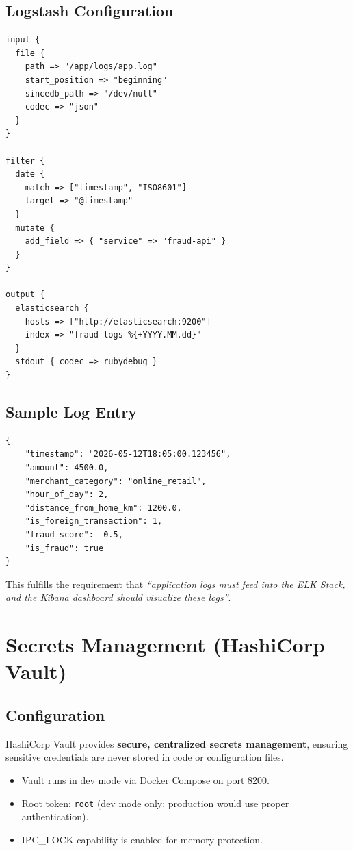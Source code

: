 \documentclass[12pt,a4paper]{article}
\begin{document}
\subsection{Logstash Configuration}

\begin{lstlisting}[language={},caption={logstash.conf}]
input {
  file {
    path => "/app/logs/app.log"
    start_position => "beginning"
    sincedb_path => "/dev/null"
    codec => "json"
  }
}

filter {
  date {
    match => ["timestamp", "ISO8601"]
    target => "@timestamp"
  }
  mutate {
    add_field => { "service" => "fraud-api" }
  }
}

output {
  elasticsearch {
    hosts => ["http://elasticsearch:9200"]
    index => "fraud-logs-%{+YYYY.MM.dd}"
  }
  stdout { codec => rubydebug }
}
\end{lstlisting}

\subsection{Sample Log Entry}

\begin{lstlisting}[language={}]
{
    "timestamp": "2026-05-12T18:05:00.123456",
    "amount": 4500.0,
    "merchant_category": "online_retail",
    "hour_of_day": 2,
    "distance_from_home_km": 1200.0,
    "is_foreign_transaction": 1,
    "fraud_score": -0.5,
    "is_fraud": true
}
\end{lstlisting}

This fulfills the requirement that \textit{``application logs must feed into the ELK Stack, and the Kibana dashboard should visualize these logs''}.

\section{Secrets Management (HashiCorp Vault)}

\subsection{Configuration}

HashiCorp Vault provides \textbf{secure, centralized secrets management}, ensuring sensitive credentials are never stored in code or configuration files.

\begin{itemize}
    \item Vault runs in dev mode via Docker Compose on port 8200.
    \item Root token: \texttt{root} (dev mode only; production would use proper authentication).
    \item IPC\_LOCK capability is enabled for memory protection.
\end{itemize}
\end{document}
